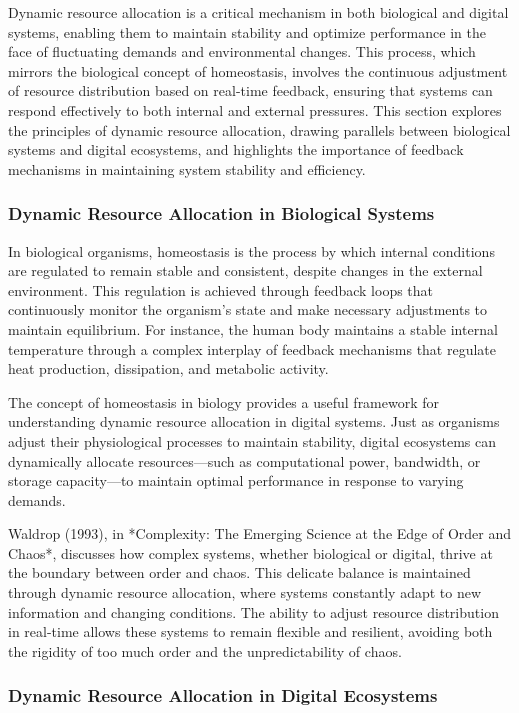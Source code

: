\documentclass[12pt,twoside]{article}
\begin{document}
Dynamic resource allocation is a critical mechanism in both biological and digital systems, enabling them to maintain stability and optimize performance in the face of fluctuating demands and environmental changes. This process, which mirrors the biological concept of homeostasis, involves the continuous adjustment of resource distribution based on real-time feedback, ensuring that systems can respond effectively to both internal and external pressures. This section explores the principles of dynamic resource allocation, drawing parallels between biological systems and digital ecosystems, and highlights the importance of feedback mechanisms in maintaining system stability and efficiency.

\subsubsection{Dynamic Resource Allocation in Biological Systems}

In biological organisms, homeostasis is the process by which internal conditions are regulated to remain stable and consistent, despite changes in the external environment. This regulation is achieved through feedback loops that continuously monitor the organism’s state and make necessary adjustments to maintain equilibrium. For instance, the human body maintains a stable internal temperature through a complex interplay of feedback mechanisms that regulate heat production, dissipation, and metabolic activity.

The concept of homeostasis in biology provides a useful framework for understanding dynamic resource allocation in digital systems. Just as organisms adjust their physiological processes to maintain stability, digital ecosystems can dynamically allocate resources—such as computational power, bandwidth, or storage capacity—to maintain optimal performance in response to varying demands.

Waldrop (1993), in *Complexity: The Emerging Science at the Edge of Order and Chaos*, discusses how complex systems, whether biological or digital, thrive at the boundary between order and chaos. This delicate balance is maintained through dynamic resource allocation, where systems constantly adapt to new information and changing conditions. The ability to adjust resource distribution in real-time allows these systems to remain flexible and resilient, avoiding both the rigidity of too much order and the unpredictability of chaos.

\subsubsection{Dynamic Resource Allocation in Digital Ecosystems}
\end{document}
